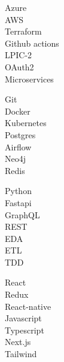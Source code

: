 \vspace{0.2cm}


\begin{minipage}[t]{0.24\textwidth}
    \Large
    \vspace{-\baselineskip}
    \faCircle \; {Azure}\\
    \faCircle \; {AWS}\\
    \faCircle \; {Terraform}\\
    \faCircle \; {Github actions}\\
    \faCircle \; {LPIC-2}\\
    \faCircle \; {OAuth2}\\
    \faCircle \; {Microservices}\\
\end{minipage}
\begin{minipage}[t]{0.25\textwidth}
    \Large
    \vspace{-\baselineskip}
    \faCircle \; {Git}\\
    \faCircle \; {Docker}\\
    \faCircle \; {Kubernetes}\\
    \faCircle \; {Postgres}\\
    \faCircle \; {Airflow}\\
    \faCircle \; {Neo4j}\\
    \faCircle \; {Redis}\\
\end{minipage}
\begin{minipage}[t]{0.25\textwidth}
    \Large
    \vspace{-\baselineskip}
    \faCircle \; {Python}\\
    \faCircle \; {Fastapi}\\
    \faCircle \; {GraphQL}\\
    \faCircle \; {REST}\\
    \faCircle \; {EDA}\\
    \faCircle \; {ETL}\\
    \faCircle \; {TDD}\\
\end{minipage}
\begin{minipage}[t]{0.25\textwidth}
    \Large
    \vspace{-\baselineskip}
    \faCircle \; {React}\\
    \faCircle \; {Redux}\\
    \faCircle \; {React-native}\\
    \faCircle \; {Javascript}\\
    \faCircle \; {Typescript}\\
    \faCircle \; {Next.js}\\
    \faCircle \; {Tailwind}\\
\end{minipage}